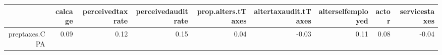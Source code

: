 \begin{table}[ht]
\centering
\begin{tabular}{rrrrrrrrr}
  \hline
 & calcage & perceivedtaxrate & perceivedauditrate & prop.alters.tTaxes & altertaxaudit.tTaxes & alterselfemployed & actor & servicestaxes \\ 
  \hline
preptaxes.CPA & 0.09 & 0.12 & 0.15 & 0.04 & -0.03 & 0.11 & 0.08 & -0.04 \\ 
   \hline
\end{tabular}
\end{table}
